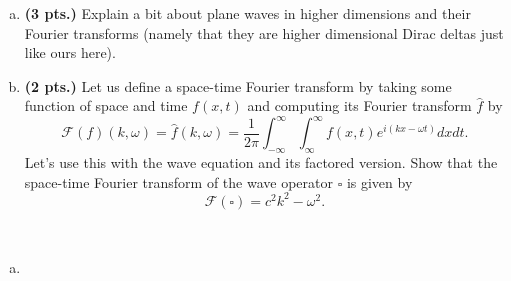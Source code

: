 \documentclass[12pt]{article} %
\begin{document}
\begin{problem}
\begin{enumerate}[(a)]
\item \textbf{(3 pts.)} Explain a bit about plane waves in higher dimensions and their Fourier transforms (namely that they are higher dimensional Dirac deltas just like ours here).

\item \textbf{(2 pts.)} Let us define a space-time Fourier transform by taking some function of space and time $f(x,t)$ and computing its Fourier transform $\hat{f}$ by 
\[
\mathcal{F}(f)(k,\omega) = \hat{f}(k,\omega) = \frac{1}{2\pi} \int_{-\infty}^\infty \int_{\infty}^\infty f(x,t) e^{i(kx-\omega t)} dxdt. 
\]
Let's use this with the wave equation and its factored version. Show that the space-time Fourier transform of the wave operator $\square$ is given by
\[
\mathcal{F}(\square) = c^2k^2 - \omega^2.
\]
\end{enumerate}
\end{problem}
\begin{solution}~
\begin{enumerate}[(a)]
\item 
\end{enumerate}
\end{solution}
\end{document}
